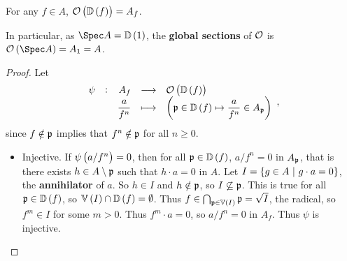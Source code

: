 \pagebreak

\begin{proposition}
For any $ f \in A $, $ \OOO\br{\DD\br{f}} = A_f $.
\end{proposition}

In particular, as $ \Spec A = \DD\br{1} $, the \textbf{global sections} of $ \mathcal{O} $ is $ \OOO\br{\Spec A} = A_1 = A $.

\begin{proof}
Let
$$ \function[\psi]{A_f}{\OOO\br{\DD\br{f}}}{\dfrac{a}{f^n}}{\br{\ppp \in \DD\br{f} \mapsto \dfrac{a}{f^n} \in A_\ppp}}, $$
since $ f \notin \mathfrak{p} $ implies that $ f^n \notin \mathfrak{p} $ for all $ n \ge 0 $.
\begin{itemize}
\item Injective. If $ \psi\br{a / f^n} = 0 $, then for all $ \ppp \in \DD\br{f} $, $ a / f^n = 0 $ in $ A_{\mathfrak{p}} $, that is there exists $ h \in A \setminus \mathfrak{p} $ such that $ h \cdot a = 0 $ in $ A $. Let $ I = \cbr{g \in A \st g \cdot a = 0} $, the \textbf{annihilator} of $ a $. So $ h \in I $ and $ h \notin \mathfrak{p} $, so $ I \not\subseteq \mathfrak{p} $. This is true for all $ \ppp \in \DD\br{f} $, so $ \VV\br{I} \cap \DD\br{f} = \emptyset $. Thus $ f \in \bigcap_{\ppp \in \VV\br{I}} \ppp = \sqrt{I} $, the radical, so $ f^m \in I $ for some $ m > 0 $. Thus $ f^m \cdot a = 0 $, so $ a / f^n = 0 $ in $ A_f $. Thus $ \psi $ is injective.



\end{itemize}
\end{proof}
